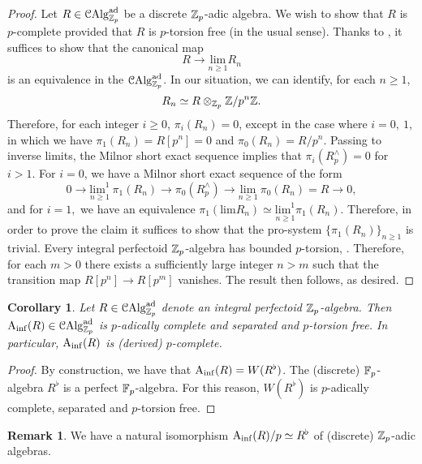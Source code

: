 \documentclass[10pt,a4paper]{amsart}
\numberwithin{equation}{subsection}
\newtheorem{corollary}[theorem]{Corollary}
\theoremstyle{definition}
\newtheorem{remark}[theorem]{Remark}
\def\lim{\mathrm{lim}}
\begin{document}
\begin{proof}
    Let $R \in \mathcal C \mathrm{Alg}^{\mathrm{ad}}_{\mathbb Z_p}$ be a discrete $\mathbb Z_p$-adic algebra. We wish to show that $R$ is $p$-complete provided that $R$ is $p$-torsion free (in the usual sense). Thanks to \cite[Lemma 8.1.2.3]{lurie2016spectral}, it suffices to show that the canonical map
        \[
            R \to \underset{n \geq 1}{\lim} R_n
        \]  
    is an equivalence in the \infcat $\mathcal C \mathrm{Alg}^{\mathrm{ad}}_{\mathbb Z_p}$. In our situation, we can identify, for each $n \geq 1$, 
        \[
            R_n \simeq R \otimes_{\mathbb Z_p} \mathbb Z/ p^n\mathbb Z .
        \]
    Therefore, for each integer $i \geq 0$, $\pi_i(R_n) = 0$, except in the case where $i=0, \ 1$, in which we have $\pi_1(R_n) = R[p^n] =0$ and $\pi_0(R_n) = R/p^n$. Passing to inverse limits, the Milnor short exact sequence implies that $\pi_i(R^\wedge_p) =0$ for $i>1$. For $i=0$, we have a Milnor short exact sequence of the form
        \begin{equation} \label{p-tors_perf}
            0 \to \underset{n \geq 1}{\lim^1} \ \pi_1(R_n) \to \pi_0(R^\wedge_p) \to \underset{n \geq 1}{\lim} \ \pi_0(R_n)= R \to 0,
        \end{equation}
    and for $i=1,$ we have an equivalence $\pi_1(\lim R_n) \simeq \underset{n \geq 1}{\lim^1} \pi_1(R_n)$. Therefore, in order to prove the claim it suffices to show that the pro-system $\{ \pi_1(R_n) \}_{n \geq 1}$ is trivial. Every integral perfectoid $\mathbb Z_p$-algebra
    has bounded $p$-torsion, \cite[]{bhatt2018topological}. Therefore, for each $m > 0$ there exists a sufficiently large integer $n > m$ such that the transition map $R[p^n] \to R[p^{m}]$ vanishes. The result then follows, as desired.
\end{proof}

\begin{corollary}
    Let $R \in \mathcal C \mathrm{Alg}^{\mathrm{ad}}_{\mathbb Z_p}$ denote an integral perfectoid $\mathbb Z_p$-algebra. Then $\mathrm{A}_{\mathrm{inf}}(R) \in \mathcal C \mathrm{Alg}^{\mathrm{ad}}_{\mathbb Z_p}$ is $p$-adically complete and separated and $p$-torsion free. In particular, $\mathrm{A}_{\mathrm{inf}}(R)$ is
    (derived) $p$-complete.
\end{corollary}

\begin{proof}
    By construction, we have that $\mathrm{A}_{\mathrm{inf}}(R) = W(R^\flat)$. The (discrete) $\mathbb F_p$-algebra $R^\flat$ is a perfect $\mathbb F_p$-algebra. For this reason, $W(R^\flat)$ is $p$-adically complete, separated and $p$-torsion free.
\end{proof}

\begin{remark}
    We have a natural isomorphism $\mathrm{A}_{\mathrm{inf}}(R) / p \simeq R^\flat$ of (discrete) $\mathbb Z_p$-adic algebras.
\end{remark}
\end{document}

